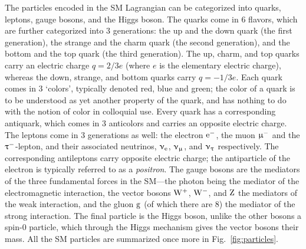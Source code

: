 The particles encoded in the SM Lagrangian can be categorized into quarks, leptons, gauge bosons, and the Higgs boson.
% 
The quarks come in 6 flavors, which are further categorized into 3 generations: the up and the down quark (the first generation), the strange and the charm quark (the second generation), and the bottom and the top quark (the third generation).
% 
The up, charm, and top quarks carry an electric charge $q = 2/3e$ (where $e$ is the elementary electric charge), whereas the down, strange, and bottom quarks carry $q=-1/3e$.
% 
Each quark comes in 3 `colors', typically denoted red, blue and green; the color of a quark is to be understood as yet another property of the quark, and has nothing to do with the notion of color in colloquial use.
% 
Every quark has a corresponding antiquark, which comes in 3 anticolors and carries an opposite electric charge.
% 
The leptons come in 3 generations as well: the electron $\mathrm{e}^-$, the muon $\upmu^-$ and the $\uptau^-$-lepton, and their associated neutrinos, $\upnu_\mathrm{e}$, $\upnu_\upmu$, and $\upnu_\uptau$ respectively.
% 
The corresponding antileptons carry opposite electric charge; the antiparticle of the electron is typically referred to as a \textit{positron}.
% 
The gauge bosons are the mediators of the three fundamental forces in the SM---the photon being the mediator of the electromagnetic interaction, the vector bosons $\mathrm{W}^+$, $\mathrm{W}^-$, and $\mathrm{Z}$ the mediators of the weak interaction, and the gluon $\mathrm{g}$ (of which there are 8) the mediator of the strong interaction.
% 
The final particle is the Higgs boson, unlike the other bosons a spin-0 particle, which through the Higgs mechanism gives the vector bosons their mass.
% 
All the SM particles are summarized once more in Fig.~\ref{fig:particles}.


